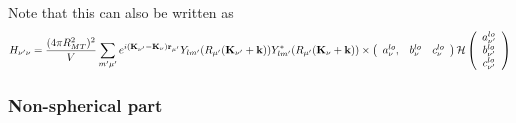 \documentclass[aps,prb,floatfix,epsfig,singlecolumn,showpacs,preprintnumbers]{revtex4}
\renewcommand{\vr}{{\mathbf{r}}}
\newcommand{\vk}{{\mathbf{k}}}
\newcommand{\vK}{{\mathbf{K}}}
\newcommand{\cH}{{\cal H}}
\begin{document}
Note that this can also be written as
\begin{eqnarray}
H_{\nu'\nu}=\frac{(4\pi  R_{MT}^2)^2}{V}\sum_{m'\mu'} e^{i(\vK_{\nu'}-\vK_\nu)\vr_{\mu'}}Y_{lm'}(R_{\mu'}(\vK_{\nu'}+\vk)) Y^*_{lm'}(R_{\mu'}(\vK_\nu+\vk))\times
\left(
\begin{array}{ccc}
a^{lo}_{\nu}, & b^{lo}_{\nu} & c^{lo}_{\nu}
\end{array}
\right)
\cH
\left(
\begin{array}{c}
a^{lo}_{\nu'}\\
b^{lo}_{\nu'}\\ 
c^{lo}_{\nu'}
\end{array}
\right)
\end{eqnarray}





\subsubsection{Non-spherical part}
\end{document}
